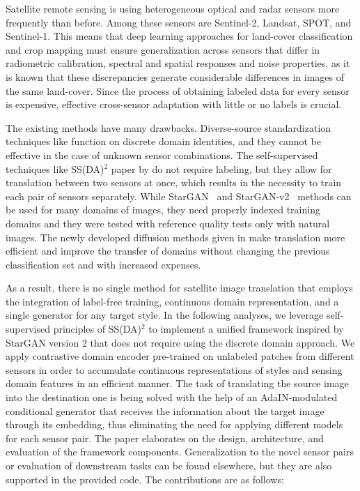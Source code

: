 \documentclass[runningheads]{llncs}
\begin{document}
Satellite remote sensing is using heterogeneous optical and radar sensors more frequently than before. Among these sensors are Sentinel-2, Landsat, SPOT, and Sentinel-1. This means that deep learning approaches for land-cover classification and crop mapping must ensure generalization across sensors that differ in radiometric calibration, spectral and spatial responses and noise properties, as it is known that these discrepancies generate considerable differences in images of the same land-cover. Since the process of obtaining labeled data for every sensor is expensive, effective cross-sensor adaptation with little or no labels is crucial.

The existing methods have many drawbacks. Diverse-source standardization techniques like \cite{tasar2020standardgan} function on discrete domain identities, and they cannot be effective in the case of unknown sensor combinations. The self-supervised techniques like SS(DA)$^2$ paper by \cite{zhang2023ssdada} do not require labeling, but they allow for translation between two sensors at once, which results in the necessity to train each pair of sensors separately. While StarGAN~\cite{choi2018stargan} and StarGAN-v2~\cite{choi2020starganv2} methods can be used for many domains of images, they need properly indexed training domains and they were tested with reference quality tests only with natural images. The newly developed diffusion methods given in \cite{vinholi2024multisensor,kieu2025universal} make translation more efficient and improve the transfer of domains without changing the previous classification set and with increased expenses.

As a result, there is no single method for satellite image translation that employs the integration of label-free training, continuous domain representation, and a single generator for any target style. In the following analyses, we leverage self-supervised principles of SS(DA)$^2$ to implement a unified framework inspired by StarGAN version 2 that does not require using the discrete domain approach. We apply contrastive domain encoder pre-trained on unlabeled patches from different sensors in order to accumulate continuous representations of styles and sensing domain features in an efficient manner. The task of translating the source image into the destination one is being solved with the help of an AdaIN-modulated conditional generator that receives the information about the target image through its embedding, thus eliminating the need for applying different models for each sensor pair. The paper elaborates on the design, architecture, and evaluation of the framework components. Generalization to the novel sensor pairs or evaluation of downstream tasks can be found elsewhere, but they are also supported in the provided code. The contributions are as follows:
\end{document}
